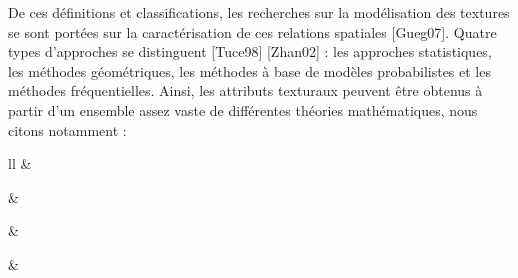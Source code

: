 De ces définitions et classifications, les recherches sur la modélisation des textures se sont portées sur la caractérisation de ces relations spatiales [Gueg07]. Quatre types d’approches se distinguent [Tuce98] [Zhan02] : 
les approches statistiques, les méthodes géométriques, les méthodes à base de modèles probabilistes et les méthodes fréquentielles. Ainsi, les attributs texturaux peuvent être obtenus à partir d’un ensemble assez vaste de différentes théories mathématiques, nous citons notamment :

\begin{table}[H]
	\begin{center}
		\begin{tabular}{ll}
			\hline
			 &   \\                             \hline 
			
			      &   \\ \hline
			
			    &   \\ \hline
			
			    &   	\\ \hline
			
		\end{tabular}
		\caption{Classification des méthodes d’extraction de texture.}
	\end{center}
\end{table}


